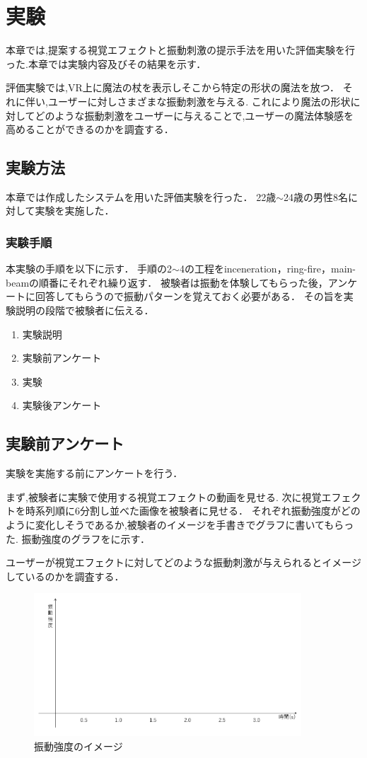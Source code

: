 \chapter{実験}
本章では,提案する視覚エフェクトと振動刺激の提示手法を用いた評価実験を行った.本章では実験内容及びその結果を示す．

評価実験では,VR上に魔法の杖を表示しそこから特定の形状の魔法を放つ．
それに伴い,ユーザーに対しさまざまな振動刺激を与える.
これにより魔法の形状に対してどのような振動刺激をユーザーに与えることで,ユーザーの魔法体験感を高めることができるのかを調査する．

\section{実験方法}
本章では作成したシステムを用いた評価実験を行った．
22歳$\sim$24歳の男性8名に対して実験を実施した．

\subsection{実験手順}
本実験の手順を以下に示す．
手順の2$\sim$4の工程をinceneration，ring-fire，main-beamの順番にそれぞれ繰り返す．
被験者は振動を体験してもらった後，アンケートに回答してもらうので振動パターンを覚えておく必要がある．
その旨を実験説明の段階で被験者に伝える．

\begin{enumerate}
    \item 実験説明
    \item 実験前アンケート
    \item 実験
    \item 実験後アンケート
\end{enumerate}

\newpage
\section{実験前アンケート}
実験を実施する前にアンケートを行う．

まず,被験者に実験で使用する視覚エフェクトの動画を見せる.
次に視覚エフェクトを時系列順に6分割し並べた画像を被験者に見せる．
それぞれ振動強度がどのように変化しそうであるか,被験者のイメージを手書きでグラフに書いてもらった.
振動強度のグラフをに示す．

ユーザーが視覚エフェクトに対してどのような振動刺激が与えられるとイメージしているのかを調査する．

\begin{figure}[h]
\centering
\includegraphics[clip,width=10cm]{./fig/ank.png}
\caption{振動強度のイメージ}\label{ank}
\end{figure}

